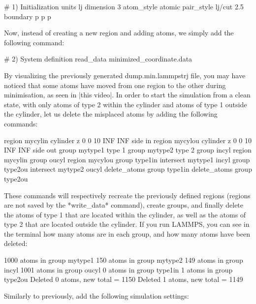 \begin{lcverbatim}
# 1) Initialization
units lj
dimension 3
atom_style atomic
pair_style lj/cut 2.5
boundary p p p
\end{lcverbatim}

Now, instead of creating a new region and adding atoms, we
simply add the following command:



\begin{lcverbatim}
# 2) System definition
read_data minimized_coordinate.data
\end{lcverbatim}

By visualizing the previously generated dump.min.lammpstrj
file, you may have noticed that some atoms have moved from
one region to the other during minimisation, as seen in
|this video|.
In order to start the simulation from a clean state, with
only atoms of type 2 within the cylinder and atoms of type
1 outside the cylinder, let us delete the misplaced atoms
by adding the following commands:





\begin{lcverbatim}
region mycylin cylinder z 0 0 10 INF INF side in
region mycylou cylinder z 0 0 10 INF INF side out
group mytype1 type 1
group mytype2 type 2
group incyl region mycylin
group oucyl region mycylou
group type1in intersect mytype1 incyl
group type2ou intersect mytype2 oucyl
delete_atoms group type1in
delete_atoms group type2ou
\end{lcverbatim}

These commands will respectively recreate
the previously defined regions (regions are not saved by the
*write_data* command), create groups, and finally delete the
atoms of type 1 that are located within the cylinder, as
well as the atoms of type 2 that are located outside the
cylinder. If you run LAMMPS, you can see in the terminal how
many atoms are in each group, and how many atoms have been
deleted:



\begin{lcverbatim}
1000 atoms in group mytype1
150 atoms in group mytype2
149 atoms in group incyl
1001 atoms in group oucyl
0 atoms in group type1in
1 atoms in group type2ou
Deleted 0 atoms, new total = 1150
Deleted 1 atoms, new total = 1149
\end{lcverbatim}

Similarly to previously, add the following simulation
settings:




